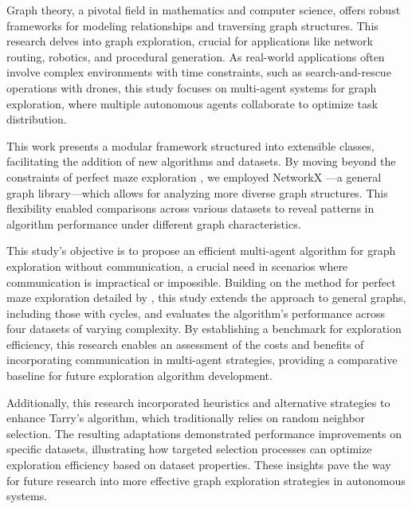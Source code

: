 Graph theory, a pivotal field in mathematics and computer science, offers robust frameworks for modeling relationships and traversing graph structures. This research delves into graph exploration, crucial for applications like network routing, robotics, and procedural generation. As real-world applications often involve complex environments with time constraints, such as search-and-rescue operations with drones, this study focuses on multi-agent systems for graph exploration, where multiple autonomous agents collaborate to optimize task distribution.

This work presents a modular framework structured into extensible classes, facilitating the addition of new algorithms and datasets. By moving beyond the constraints of perfect maze exploration \cite{Naeem2021}, we employed NetworkX \cite{Hagberg2008}—a general graph library—which allows for analyzing more diverse graph structures. This flexibility enabled comparisons across various datasets to reveal patterns in algorithm performance under different graph characteristics.

This study's objective is to propose an efficient multi-agent algorithm for graph exploration without communication, a crucial need in scenarios where communication is impractical or impossible. Building on the method for perfect maze exploration detailed by , this study extends the approach to general graphs, including those with cycles, and evaluates the algorithm's performance across four datasets of varying complexity. By establishing a benchmark for exploration efficiency, this research enables an assessment of the costs and benefits of incorporating communication in multi-agent strategies, providing a comparative baseline for future exploration algorithm development.

Additionally, this research incorporated heuristics and alternative strategies to enhance Tarry's algorithm, which traditionally relies on random neighbor selection. The resulting adaptations demonstrated performance improvements on specific datasets, illustrating how targeted selection processes can optimize exploration efficiency based on dataset properties. These insights pave the way for future research into more effective graph exploration strategies in autonomous systems.